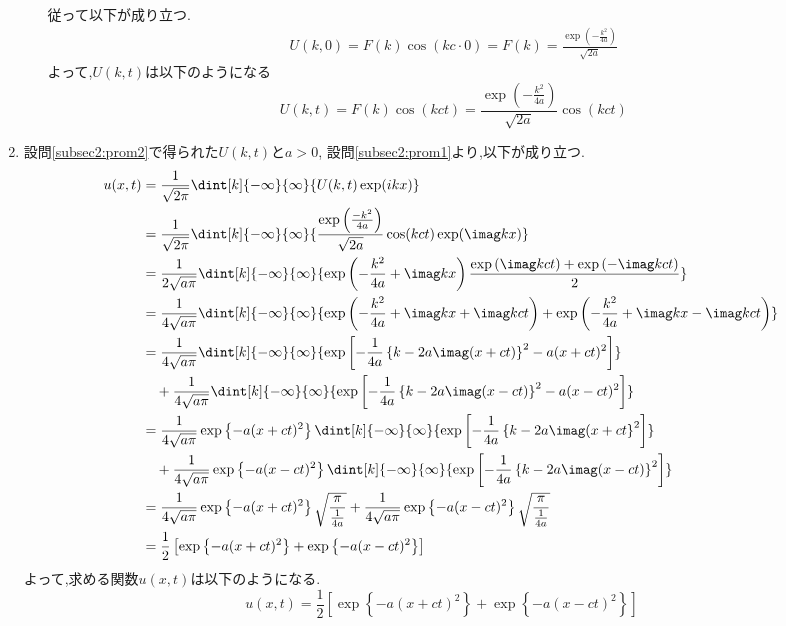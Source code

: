 \documentclass[dvipdfmx,titlepage, 11pt, a4paper]{jsarticle}%
\begin{document}
\begin{enumerate}[(1)]
\begin{enumerate}[(i)]
\begin{align*}
        \end{align*}
        従って以下が成り立つ.
        \begin{align*}
            U(k, 0) = F(k)\cos(kc\cdot 0) = F(k) = \frac{\exp \left(-\frac{k^{2}}{4a}\right)}{\sqrt{2a}}
        \end{align*}
        よって,$U(k, t)$は以下のようになる
        \begin{equation}
            U(k, t) = F(k)\cos(kct) = \frac{\exp \left(-\frac{k^{2}}{4a}\right)}{\sqrt{2a}}\cos(kct)
        \end{equation}
    \end{enumerate}
  \item 設問\eqref{subsec2:prom2}で得られた$U(k, t)$と$a > 0$, 設問\eqref{subsec2:prom1}より,以下が成り立つ.
    \begin{align*}
        u(x, t) &= \frac{1}{\sqrt{2\pi}}\dint[k]{-\infty}{\infty}{U(k, t)\exp(ikx)}\\
        &= \frac{1}{\sqrt{2\pi}}\dint[k]{-\infty}{\infty}{\frac{\exp\left(\frac{-k^2}{4a}\right)}{\sqrt{2a}}\cos(kct)\exp(\imag kx)}\\
        &= \frac{1}{2\sqrt{a\pi}}\dint[k]{-\infty}{\infty}{\exp\left(-\frac{k^2}{4a} + \imag kx\right)\frac{\exp\left(\imag kct\right) + \exp\left(-\imag kct\right)}{2}}\\
        &= \frac{1}{4\sqrt{a\pi}}\dint[k]{-\infty}{\infty}{\exp\left(-\frac{k^2}{4a} + \imag kx + \imag kct\right) + \exp\left(-\frac{k^2}{4a} + \imag kx - \imag kct\right)}\\
        &= \frac{1}{4\sqrt{a\pi}}\dint[k]{-\infty}{\infty}{\exp\left[-\frac{1}{4a}\left\{k - 2a\imag (x + ct)\right\}^2 - a(x + ct)^2\right]}\\
        &\quad+ \frac{1}{4\sqrt{a\pi}}\dint[k]{-\infty}{\infty}{\exp\left[-\frac{1}{4a}\left\{k - 2a\imag (x - ct)\right\}^2 - a(x - ct)^2\right]}\\
        &= \frac{1}{4\sqrt{a\pi}}\exp\left\{-a(x + ct)^2\right\}\dint[k]{-\infty}{\infty}{\exp\left[-\frac{1}{4a}\left\{k - 2a\imag (x + ct\right\}^2\right]}\\
        &\quad+ \frac{1}{4\sqrt{a\pi}}\exp\left\{-a(x - ct)^2\right\}\dint[k]{-\infty}{\infty}{\exp\left[-\frac{1}{4a}\left\{k - 2a\imag (x - ct)\right\}^2\right]}\\
        &= \frac{1}{4\sqrt{a\pi}}\exp\left\{-a(x + ct)^2\right\}\sqrt{\frac{\pi}{\frac{1}{4a}}} + \frac{1}{4\sqrt{a\pi}}\exp\left\{-a(x - ct)^2\right\}\sqrt{\frac{\pi}{\frac{1}{4a}}}\\
        &= \frac{1}{2}\left[\exp\left\{-a(x + ct)^2\right\} + \exp\left\{-a(x - ct)^2\right\}\right]
     \end{align*}
    よって,求める関数$u(x, t)$は以下のようになる.
    \begin{equation*}
        u(x, t) = \frac{1}{2}\left[\exp\left\{-a(x + ct)^2\right\} + \exp\left\{-a(x - ct)^2\right\}\right]
    \end{equation*}
\end{enumerate}
\end{document}
